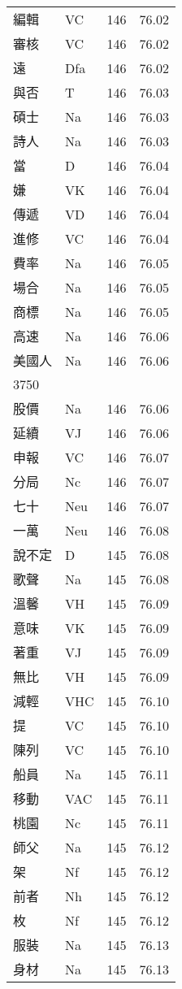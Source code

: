 \documentclass[twocolumn]{book}
\begin{document}
\begin{supertabular}{llrr}
編輯 & VC & 146 &  76.02\\
審核 & VC & 146 &  76.02\\
遠 & Dfa & 146 &  76.02\\
與否 & T & 146 &  76.03\\
碩士 & Na & 146 &  76.03\\
詩人 & Na & 146 &  76.03\\
當 & D & 146 &  76.04\\
嫌 & VK & 146 &  76.04\\
傳遞 & VD & 146 &  76.04\\
進修 & VC & 146 &  76.04\\
費率 & Na & 146 &  76.05\\
場合 & Na & 146 &  76.05\\
商標 & Na & 146 &  76.05\\
高速 & Na & 146 &  76.06\\
美國人 & Na & 146 &  76.06\\
3750\\
股價 & Na & 146 &  76.06\\
延續 & VJ & 146 &  76.06\\
申報 & VC & 146 &  76.07\\
分局 & Nc & 146 &  76.07\\
七十 & Neu & 146 &  76.07\\
一萬 & Neu & 146 &  76.08\\
說不定 & D & 145 &  76.08\\
歌聲 & Na & 145 &  76.08\\
溫馨 & VH & 145 &  76.09\\
意味 & VK & 145 &  76.09\\
著重 & VJ & 145 &  76.09\\
無比 & VH & 145 &  76.09\\
減輕 & VHC & 145 &  76.10\\
提 & VC & 145 &  76.10\\
陳列 & VC & 145 &  76.10\\
船員 & Na & 145 &  76.11\\
移動 & VAC & 145 &  76.11\\
桃園 & Nc & 145 &  76.11\\
師父 & Na & 145 &  76.12\\
架 & Nf & 145 &  76.12\\
前者 & Nh & 145 &  76.12\\
枚 & Nf & 145 &  76.12\\
服裝 & Na & 145 &  76.13\\
身材 & Na & 145 &  76.13\\

\end{supertabular}
\end{document}
